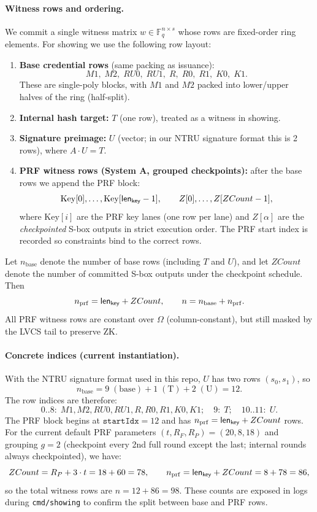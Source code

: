 \paragraph{Witness rows and ordering.}
We commit a single witness matrix $w\in\mathbb{F}_q^{n\times s}$ whose rows are fixed-order ring elements. For showing we
use the following row layout:
\begin{enumerate}
  \item \textbf{Base credential rows} (same packing as issuance):
  \[
  M1,\;M2,\;RU0,\;RU1,\;R,\;R0,\;R1,\;K0,\;K1.
  \]
  These are single-poly blocks, with $M1$ and $M2$ packed into lower/upper halves of the ring (half-split).
  \item \textbf{Internal hash target:} $T$ (one row), treated as a witness in showing.
  \item \textbf{Signature preimage:} $U$ (vector; in our NTRU signature format this is 2 rows), where $A\cdot U = T$.
  \item \textbf{PRF witness rows (System A, grouped checkpoints):}
  after the base rows we append the PRF block:
  \[
  \mathrm{Key}[0],\dots,\mathrm{Key}[\mathsf{len}_{\mathsf{key}}-1],\qquad Z[0],\dots,Z[ZCount-1],
  \]
  where $\mathrm{Key}[i]$ are the PRF key lanes (one row per lane) and $Z[\alpha]$ are the \emph{checkpointed} S-box outputs
  in strict execution order. The PRF start index is recorded so constraints bind to the correct rows.
\end{enumerate}
Let $n_{\mathrm{base}}$ denote the number of base rows (including $T$ and $U$), and let $ZCount$ denote the number of
committed S-box outputs under the checkpoint schedule. Then
\[
n_{\mathrm{prf}}=\mathsf{len}_{\mathsf{key}} + ZCount,\qquad n=n_{\mathrm{base}}+n_{\mathrm{prf}}.
\]
All PRF witness rows are constant over $\Omega$ (column-constant), but still masked by the LVCS tail to preserve ZK.

\paragraph{Concrete indices (current instantiation).}
With the NTRU signature format used in this repo, $U$ has two rows $(s_0,s_1)$, so
\[
n_{\mathrm{base}} = 9\;(\text{base}) + 1\;(\text{T}) + 2\;(\text{U}) = 12.
\]
The row indices are therefore:
\[
0..8:\;M1,M2,RU0,RU1,R,R0,R1,K0,K1;\quad 9:\;T;\quad 10..11:\;U.
\]
The PRF block begins at $\texttt{startIdx}=12$ and has $n_{\mathrm{prf}}=\mathsf{len}_{\mathsf{key}}+ZCount$ rows. For the current default
PRF parameters $(t,R_F,R_P)=(20,8,18)$ and grouping $g=2$ (checkpoint every 2nd full round except the last; internal rounds
always checkpointed), we have:
\[
ZCount = R_P + 3\cdot t = 18 + 60 = 78,\qquad n_{\mathrm{prf}}=\mathsf{len}_{\mathsf{key}}+ZCount=8+78=86,
\]
so the total witness rows are $n=12+86=98$. These counts are exposed in logs during \texttt{cmd/showing} to confirm the
split between base and PRF rows.

